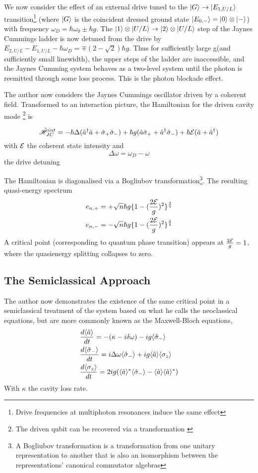 We now consider the effect of an external drive tuned to the $| G \rangle \rightarrow | E_{1, U/L} \rangle$ transition\footnote{Drive frequencies at multiphoton resonances induce the same effect} (where $| G \rangle$ is the coincident dressed ground state $| E_{0, -} \rangle = | 0 \rangle \otimes | - \rangle$) with frequency $\omega_D = \hbar \omega_0 \pm \hbar g$.
The $| 1 \rangle \otimes | U/L \rangle \rightarrow | 2 \rangle \otimes | U/L \rangle$ step of the Jaynes Cummings ladder is now detuned from the drive by $E_{2, U/L} - E_{1, U/L} - \hbar \omega_D =  \mp(2-\sqrt{2}) \hbar g$. Thus for sufficiently large g(and sufficiently small linewidth), the upper steps of the ladder are inaccessible, and the Jaynes Cumming system behaves as a two-level system until the photon is reemitted through some loss process. This is the photon blockade effect.

The author now considers the Jaynes Cummings oscillator driven by a coherent field. Transformed to an interaction picture, the Hamiltonian for the driven cavity mode \footnote{The driven qubit can be recovered via a transformation \autocite{Alsing1999}} is 

\begin{equation}
	\hat{\mathscr{H}}_{JC}^{int} = -\hbar \Delta (\hat{a}^\dagger \hat{a} + \hat{\sigma}_+ \hat{\sigma}_-) + \hbar g(\hat{a} \hat{\sigma}_+ + \hat{a}^\dagger \hat{\sigma}_-) + \hbar \mathcal{E}(\hat{a} + \hat{a}^\dagger)
\end{equation}
with $\mathcal{E}$ the coherent state intensity and
\begin{equation}
	\Delta \omega = \omega_D - \omega
\end{equation}
the drive detuning

The Hamiltonian is diagonalised via a Bogliubov transformation\footnote{A Bogliubov transformation is a transformation from one unitary representation to another that is also an isomorphism between the representations' canonical commutator algebras}. The resulting quasi-energy spectrum
\begin{align}
	e_{n, +} &= + \sqrt{n} \hbar g \{1 - ({\frac{2\mathcal{E}}{g}})^2\}^{\frac{3}{4}} \\
	e_{n, -} &= - \sqrt{n} \hbar g \{1 - ({\frac{2\mathcal{E}}{g}})^2\}^{\frac{3}{4}}
\end{align}
A critical point (corresponding to quantum phase transition) appears at $\frac{2\mathcal{E}}{g} = 1$, where the quasienergy splitting collapses to zero.

\subsection{The Semiclassical Approach}
The author now demonstrates the existence of the same critical point in a semiclassical treatment of the system based on what he calls the neoclassical equations, but are more commonly known as the Maxwell-Bloch equations, 
\begin{align}
	&\frac{d \langle \hat{a} \rangle}{dt} = -(\kappa -i \delta \omega)-ig \langle \hat{\sigma}_- \rangle \\
	&\frac{d \langle \hat{\sigma}_- \rangle}{dt} = i \Delta \omega \langle \hat{\sigma}_- \rangle +ig \langle \hat{a} \rangle \langle \sigma_z \rangle \\	
	&\frac{d \langle \sigma_z \rangle}{dt} = 2 i g(\langle \hat{a} \rangle^* \langle \hat{\sigma}_- \rangle -\langle \hat{a} \rangle \langle \hat{a} \rangle^*)
\end{align}
With $\kappa$ the cavity loss rate.

